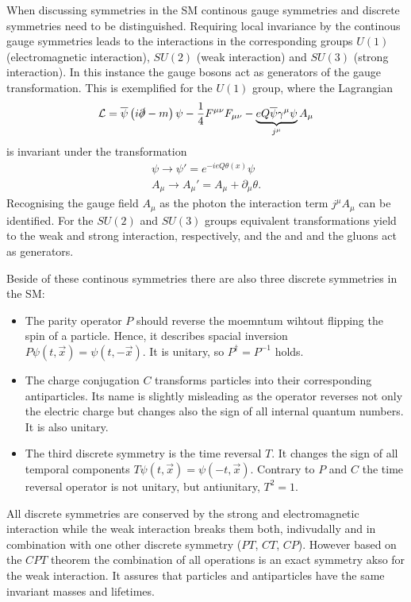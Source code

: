 When discussing symmetries in the \ac{SM} continous gauge symmetries and discrete symmetries need to be distinguished. Requiring
local invariance by the continous gauge symmetries leads to the interactions in the corresponding groups $U(1)$ (electromagnetic
interaction), $SU(2)$ (weak interaction) and $SU(3)$ (strong interaction). In this instance the gauge bosons act as generators
of the gauge transformation. This is exemplified for the $U(1)$ group, where the Lagrangian
\begin{equation}
\mathcal{L}=\overline{\psi}\left(i\slashed{\partial} - m\right)\psi
- \frac{1}{4}F^{\mu\nu}F_{\mu\nu} - \underbrace{eQ\overline{\psi}\gamma^{\mu}\psi}_{j^{\mu}}A_{\mu}
\end{equation}
is invariant under the transformation
\begin{align}
\psi\rightarrow\psi'=e^{-ieQ\theta\left(x\right)}\psi\\
A_\mu\rightarrow A_\mu'=A_\mu+\partial_\mu\theta.
\end{align}
Recognising the gauge field $A_\mu$ as the photon the interaction term $j^\mu A_\mu$ can be identified. For the $SU(2)$ and $SU(3)$
groups equivalent transformations yield to the weak and strong interaction, respectively, and the \Wpm and \Z and the gluons act as
generators.

Beside of these continous symmetries there are also three discrete symmetries in the \ac{SM}:
\begin{itemize}
	\item The parity operator $P$ should reverse the moemntum wihtout flipping the spin of a particle. Hence, it describes spacial
		inversion $P\psi\left(t,\vec{x}\right) = \psi\left(t,-\vec{x}\right)$. It is unitary, so $P^{\dagger}=P^{-1}$ holds.
	\item The charge conjugation $C$ transforms particles into their corresponding antiparticles. Its name is slightly misleading
		as the operator reverses not only the electric charge but changes also the sign of all internal quantum numbers. It is also
		unitary.
	\item The third discrete symmetry is the time reversal $T$. It changes the sign of all temporal components
		$T\psi\left(t,\vec{x}\right) = \psi\left(-t,\vec{x}\right)$. Contrary to $P$ and $C$ the time reversal operator is not unitary,
		but antiunitary, \ie $T^2=1$.
\end{itemize}
All discrete symmetries are conserved by the strong and electromagnetic interaction while the weak interaction breaks them both,
indivudally and in combination with one other discrete symmetry ($PT$, $CT$, $CP$). However based on the $CPT$ theorem the combination
of all operations is an exact symmetry akso for the weak interaction. It assures that particles and antiparticles have the same
invariant masses and lifetimes.

